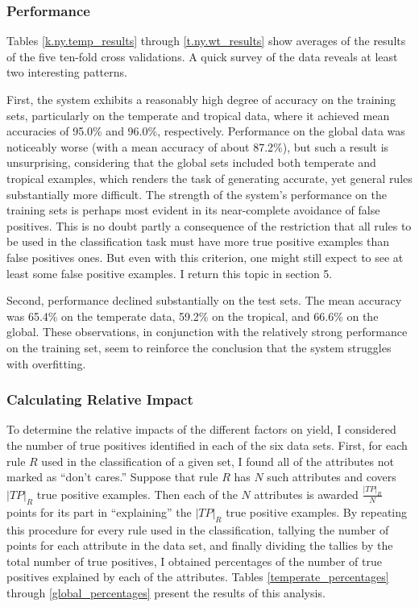 \documentclass[12pt,twoside]{article}
\begin{document}
\subsubsection{Performance}

Tables \ref{k.ny.temp_results} through \ref{t.ny.wt_results} show averages of the results of the five ten-fold cross validations. A quick survey of the data reveals at least two interesting patterns.

First, the system exhibits a reasonably high degree of accuracy on the training sets, particularly on the temperate and tropical data, where it achieved mean accuracies of 95.0\% and 96.0\%, respectively. Performance on the global data was noticeably worse (with a mean accuracy of about 87.2\%), but such a result is unsurprising, considering that the global sets included both temperate and tropical examples, which renders the task of generating accurate, yet general rules substantially more difficult. The strength of the system's performance on the training sets is perhaps most evident in its near-complete avoidance of false positives. This is no doubt partly a consequence of the restriction that all rules to be used in the classification task must have more true positive examples than false positives ones. But even with this criterion, one might still expect to see at least some false positive examples. I return this topic in section 5.

Second, performance declined substantially on the test sets. The mean accuracy was 65.4\% on the temperate data, 59.2\% on the tropical, and 66.6\% on the global. These observations, in conjunction with the relatively strong performance on the training set, seem to reinforce the conclusion that the system struggles with overfitting.

\subsubsection{Calculating Relative Impact}

To determine the relative impacts of the different factors on yield, I considered the number of true positives identified in each of the six data sets. First, for each rule $R$ used in the classification of a given set, I found all of the attributes not marked as ``don't cares.'' Suppose that rule $R$ has $N$ such attributes and covers $|TP|_R$ true positive examples. Then each of the $N$ attributes is awarded $\frac{|TP|_R}{N}$ points for its part in ``explaining'' the $|TP|_R$ true positive examples. By repeating this procedure for every rule used in the classification, tallying the number of points for each attribute in the data set, and finally dividing the tallies by the total number of true positives, I obtained percentages of the number of true positives explained by each of the attributes. Tables \ref{temperate_percentages} through \ref{global_percentages} present the results of this analysis. 
\end{document}
